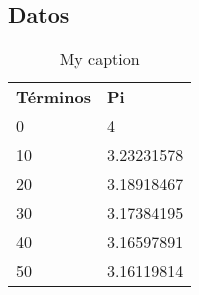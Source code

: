 \documentclass{article}
\begin{document}
\subsection{Datos}
\begin{table}[]
\centering
\caption{My caption}
\label{my-label}
\begin{tabular}{ll}
\textbf{Términos} & \textbf{Pi} \\
0                 & 4           \\
10                & 3.23231578  \\
20                & 3.18918467  \\
30                & 3.17384195  \\
40                & 3.16597891  \\
50                & 3.16119814 
\end{tabular}
\end{table}
\end{document}
